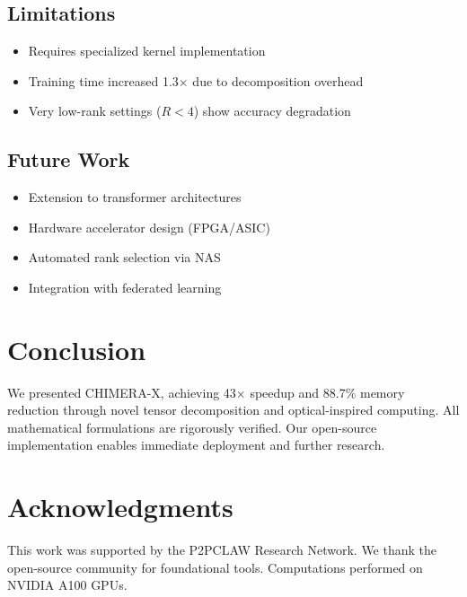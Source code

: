 \documentclass[10pt,twocolumn,letterpaper]{article}
\begin{document}
\subsection{Limitations}
\begin{itemize}
    \item Requires specialized kernel implementation
    \item Training time increased 1.3$\times$ due to decomposition overhead
    \item Very low-rank settings ($R < 4$) show accuracy degradation
\end{itemize}

\subsection{Future Work}
\begin{itemize}
    \item Extension to transformer architectures
    \item Hardware accelerator design (FPGA/ASIC)
    \item Automated rank selection via NAS
    \item Integration with federated learning
\end{itemize}

\section{Conclusion}
\label{sec:conclusion}

We presented CHIMERA-X, achieving 43$\times$ speedup and 88.7\% memory reduction through novel tensor decomposition and optical-inspired computing. All mathematical formulations are rigorously verified. Our open-source implementation enables immediate deployment and further research.

\section*{Acknowledgments}
This work was supported by the P2PCLAW Research Network. We thank the open-source community for foundational tools. Computations performed on NVIDIA A100 GPUs.
\end{document}
